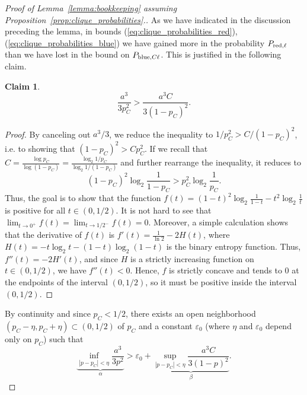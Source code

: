 \documentclass[11pt]{amsart}
\newtheorem{claim}[theorem]{\bf Claim}
\theoremstyle{definition}
\newenvironment{claimproof}{%
  \renewcommand{\qedsymbol}{$\boxdot$}%
  \begin{proof}%
}{%
  \end{proof}%
  \renewcommand{\qedsymbol}{$\square$}%
}
\def\eps{\varepsilon}
\begin{document}
\begin{proof}[Proof of Lemma~\ref{lemma:bookkeeping} assuming Proposition~\ref{prop:clique_probabilities}.]
As we have indicated in the discussion preceding the lemma, in bounds (\ref{eq:clique_probabilities_red}), (\ref{eq:clique_probabilities_blue}) we have gained more in the probability $P_{{\rm red}, \ell}$ than we have lost in the bound on $P_{{\rm blue}, C\ell}$. This is justified in the following claim.
\begin{claim}\label{claim:inequality}
{\smaller[0.3]
\[\frac{a^3}{3p_C^2}>\frac{a^3C}{3(1-p_C)^2}.\]
}
\end{claim}
\begin{claimproof}
By canceling out $a^3/3$, we reduce the inequality to $1/p_C^{2}>C/(1-p_C)^2$, i.e. to showing that $(1-p_C)^2>Cp_C^2$. If we recall that $C=\frac{\log p_C}{\log (1-p_C)}=\frac{\log_2 1/p_C}{\log_2 1/(1-p_C)}$ and further rearrange the inequality, it reduces to
{\smaller[0.3]
\[(1-p_C)^2\log_2 \frac{1}{1-p_C}>p_C^2\log_2 \frac{1}{p_C}.\]
}
Thus, the goal is to show that the function $f(t)=(1-t)^2 \log_2 \frac{1}{1-t}-t^2 \log_2 \frac{1}{t}$ is positive for all $t\in (0, 1/2)$. It is not hard to see that $\lim_{t\to 0^+}f(t)=\lim_{t\to 1/2^-}f(t)=0$. Moreover, a simple calculation shows that the derivative of $f(t)$ is $f'(t)=\frac{1}{\ln 2}-2H(t)$, where $H(t)=-t\log_2 t-(1-t)\log_2(1-t)$ is the binary entropy function. Thus, $f''(t)=-2H'(t)$, and since $H$ is a strictly increasing function on $t\in (0, 1/2)$, we have $f''(t)<0$. Hence, $f$ is strictly concave and tends to $0$ at the endpoints of the interval $(0, 1/2)$, so it must be positive inside the interval $(0, 1/2)$.
\end{claimproof}

By continuity and since $p_C<1/2$, there exists an open neighborhood $(p_C-\eta, p_C+\eta)\subset (0, 1/2)$ of $p_C$ and a constant $\eps_0$ (where $\eta$ and $\eps_0$ depend only on $p_C$) such that
{\smaller[0.3]
\[\underbrace{\inf_{|p-p_C|< \eta}\frac{a^3}{3p^2}}_{\alpha}>\eps_0+\underbrace{\sup_{|p-p_C|< \eta}\frac{a^3C}{3(1-p)^2}}_{\beta}.\]
}


\end{proof}
\end{document}
